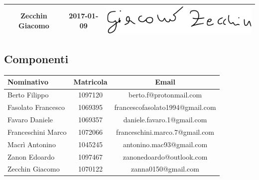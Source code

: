 \documentclass[../PianoDiProgetto_v3.0.0.tex]{subfiles}
\begin{document}
\begin{table}[h]
\begin{tabularx}{\textwidth}{C C C}
			Zecchin Giacomo & 2017-01-09 &	\includegraphics[scale=0.3]{Firme/gzecchin_firma} \\[1.2ex]
			\bottomrule
		\end{tabularx}
		
	\end{table}
	
\vfill
	
	\subsection{Componenti}
		\begin{table}[h]
	
		\begin{tabularx}{\textwidth}{lc C}
			\toprule
			\textbf{Nominativo} & \textbf{Matricola} & \textbf{Email} \\
			\midrule
			Berto Filippo & 1097120 & berto.f@protonmail.com \\
			Fasolato Francesco & 1069395 & francescofasolato1994@gmail.com  \\
			Favaro Daniele	& 1069357 & daniele.favaro.1@gmail.com\\
			Franceschini Marco & 1072066 & franceschini.marco.7@gmail.com\\
			Macrì Antonino & 1045245 & antonino.mac93@gmail.com\\
			Zanon Edoardo & 1097467 & zanonedoardo@outlook.com	 \\
			Zecchin Giacomo & 1070122 & zanna0150@gmail.com \\
			\bottomrule
		\end{tabularx}
		
		\end{table}		
\vfill			
\end{document}
